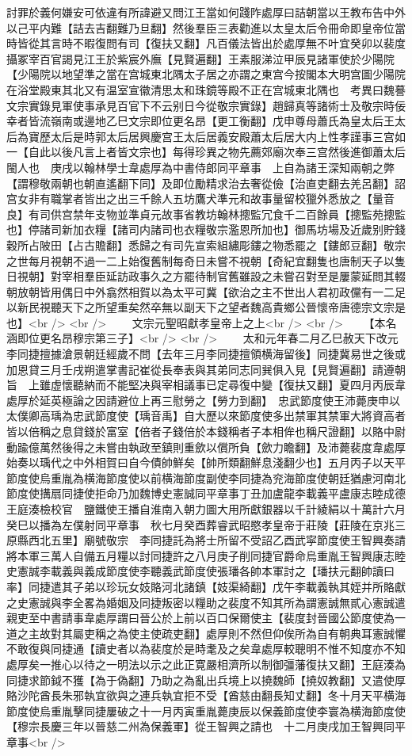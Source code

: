 討罪於義何嫌安可依違有所諱避又問江王當如何踐阼處厚曰詰朝當以王教布告中外以己平内難【詰去吉翻難乃旦翻】然後羣臣三表勸進以太皇太后令冊命即皇帝位當時皆從其言時不暇復問有司【復扶又翻】凡百儀法皆出於處厚無不叶宜癸卯以裴度攝冢宰百官謁見江王於紫宸外廡【見賢遍翻】王素服涕泣甲辰見諸軍使於少陽院【少陽院以地望準之當在宫城東北隅太子居之亦謂之東宫今按閣本大明宫圖少陽院在浴堂殿東其北又有温室宣徽清思太和珠鏡等殿不正在宫城東北隅也　考異曰魏謩文宗實錄見軍使事承見百官下不云别日今從敬宗實錄】趙歸真等諸術士及敬宗時佞幸者皆流嶺南或邊地乙巳文宗即位更名昂【更工衡翻】戊申尊母蕭氏為皇太后王太后為寶歷太后是時郭太后居興慶宫王太后居義安殿蕭太后居大内上性孝謹事三宫如一【自此以後凡言上者皆文宗也】每得珍異之物先薦郊廟次奉三宫然後進御蕭太后閩人也　庚戌以翰林學士韋處厚為中書侍郎同平章事　上自為諸王深知兩朝之弊【謂穆敬兩朝也朝直遙翻下同】及即位勵精求治去奢從儉【治直吏翻去羌呂翻】詔宫女非有職掌者皆出之出三千餘人五坊鷹犬準元和故事量留校獵外悉放之【量音良】有司供宫禁年支物並準貞元故事省教坊翰林摠監冗食千二百餘員【摠監苑摠監也】停諸司新加衣糧【諸司内諸司也衣糧敬宗濫恩所加也】御馬坊場及近歲别貯錢穀所占陂田【占古贍翻】悉歸之有司先宣索組繡彫鏤之物悉罷之【鏤郎豆翻】敬宗之世每月視朝不過一二上始復舊制每奇日未嘗不視朝【奇紀宜翻隻也唐制天子以隻日視朝】對宰相羣臣延訪政事久之方罷待制官舊雖設之未嘗召對至是屢蒙延問其輟朝放朝皆用偶日中外翕然相賀以為太平可冀【欲治之主不世出人君初政儻有一二足以新民視聽天下之所望重矣然卒無以副天下之望者魏高貴鄉公晉懷帝唐德宗文宗是也】<br />
<br />
　　文宗元聖昭獻孝皇帝上之上<br />
<br />
　　【本名涵即位更名昂穆宗第三子】<br />
<br />
　　太和元年春二月乙巳赦天下改元　李同捷擅據滄景朝廷經歲不問【去年三月李同捷擅領横海留後】同捷冀易世之後或加恩貸三月壬戌朔遣掌書記崔從長奉表與其弟同志同巽俱入見【見賢遍翻】請遵朝旨　上雖虚懷聽納而不能堅决與宰相議事已定尋復中變【復扶又翻】夏四月丙辰韋處厚於延英極論之因請避位上再三慰勞之【勞力到翻】　忠武節度使王沛薨庚申以太僕卿高瑀為忠武節度使【瑀音禹】自大歷以來節度使多出禁軍其禁軍大將資高者皆以倍稱之息貸錢於富室【倍者子錢倍於本錢稱者子本相侔也稱尺證翻】以賂中尉動踰億萬然後得之未嘗由執政至鎮則重歛以償所負【歛力瞻翻】及沛薨裴度韋處厚始奏以瑀代之中外相賀曰自今債帥鮮矣【帥所類翻鮮息淺翻少也】五月丙子以天平節度使烏重胤為横海節度使以前横海節度副使李同捷為兖海節度使朝廷猶慮河南北節度使搆扇同捷使拒命乃加魏博史憲誠同平章事丁丑加盧龍李載義平盧康志睦成德王庭湊檢校官　鹽鐵使王播自淮南入朝力圖大用所獻銀器以千計綾絹以十萬計六月癸巳以播為左僕射同平章事　秋七月癸酉葬睿武昭愍孝皇帝于莊陵【莊陵在京兆三原縣西北五里】廟號敬宗　李同捷託為將士所留不受詔乙酉武寜節度使王智興奏請將本軍三萬人自備五月糧以討同捷許之八月庚子削同捷官爵命烏重胤王智興康志睦史憲誠李載義與義成節度使李聽義武節度使張璠各帥本軍討之【璠扶元翻帥讀曰率】同捷遣其子弟以珍玩女妓賂河北諸鎮【妓渠綺翻】戊午李載義執其姪并所賂獻之史憲誠與李全畧為婚姻及同捷叛密以糧助之裴度不知其所為謂憲誠無貳心憲誠遣親吏至中書請事韋處厚謂曰晉公於上前以百口保爾使主【裴度封晉國公節度使為一道之主故對其屬吏稱之為使主使疏吏翻】處厚則不然但仰俟所為自有朝典耳憲誠懼不敢復與同捷通【讀史者以為裴度於是時耄及之矣韋處厚較聰明不惟不知度亦不知處厚矣一推心以待之一明法以示之此正寛嚴相濟所以制御彊藩復扶又翻】王庭湊為同捷求節鉞不獲【為于偽翻】乃助之為亂出兵境上以撓魏師【撓奴教翻】又遣使厚賂沙陀酋長朱邪執宜欲與之連兵執宜拒不受【酋慈由翻長知丈翻】冬十月天平横海節度使烏重胤擊同捷屢破之十一月丙寅重胤薨庚辰以保義節度使李寰為横海節度使【穆宗長慶三年以晉慈二州為保義軍】從王智興之請也　十二月庚戌加王智興同平章事<br />
